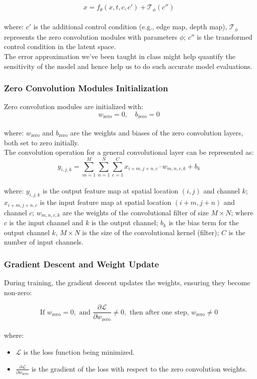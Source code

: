 \documentclass[12pt]{article}
\begin{document}
\[
\hat{x} = f_\theta(x, t, c, c') + \mathcal{T}_\phi(c'')
\]
\\
where: $c'$ is the additional control condition (e.g., edge map, depth map), $\mathcal{T}_\phi$ represents the zero convolution modules with parameters $\phi$; $c''$ is the transformed control condition in the latent space.
\\
The error approximation we've been taught in class might help quantify the sensitivity of the model and hence help us to do such accurate model evaluations.

\subsubsection*{Zero Convolution Modules Initialization}

Zero convolution modules are initialized with:
\[ w_{\text{zero}} = 0, \quad b_{\text{zero}} = 0 \]
\\
where: $w_{\text{zero}}$ and $b_{\text{zero}}$ are the weights and biases of the zero convolution layers, both set to zero initially.
\\
The convolution operation for a general convolutional layer can be represented as:
\[
y_{i, j, k} = \sum_{m=1}^{M} \sum_{n=1}^{N} \sum_{c=1}^{C} x_{i+m, j+n, c} \cdot w_{m, n, c, k} + b_k
\]
\\
where: $y_{i, j, k}$ is the output feature map at spatial location $(i, j)$ and channel $k$; $x_{i+m, j+n, c}$ is the input feature map at spatial location $(i+m, j+n)$ and channel $c$; $w_{m, n, c, k}$ are the weights of the convolutional filter of size $M \times N$; where $c$ is the input channel and $k$ is the output channel; $b_k$ is the bias term for the output channel $k$, $M \times N$ is the size of the convolutional kernel (filter); $C$ is the number of input channels.

\subsubsection*{Gradient Descent and Weight Update}

During training, the gradient descent updates the weights, ensuring they become non-zero:

\[
\text{If } w_{\text{zero}} = 0, \text{ and } \frac{\partial \mathcal{L}}{\partial w_{\text{zero}}} \neq 0, \text{ then after one step, } w_{\text{zero}} \neq 0
\]
\\
where:
\begin{itemize}
    \item $\mathcal{L}$ is the loss function being minimized.
    \item $\frac{\partial \mathcal{L}}{\partial w_{\text{zero}}}$ is the gradient of the loss with respect to the zero convolution weights.
\end{itemize}
\end{document}
